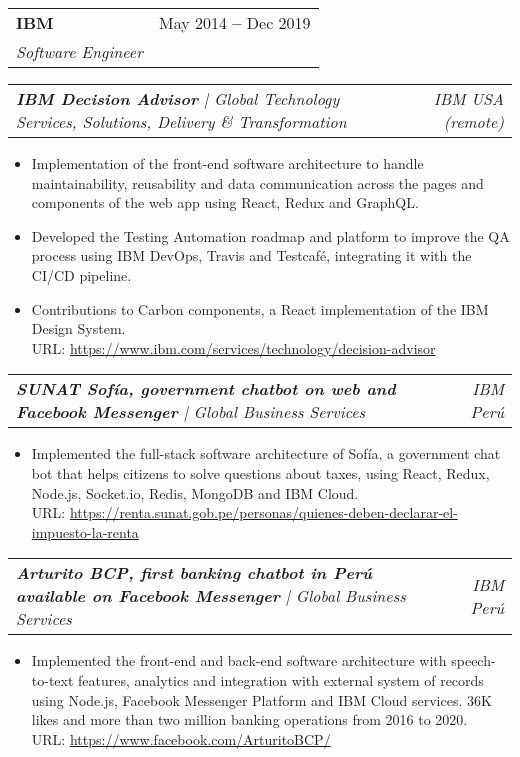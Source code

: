 \documentclass[letterpaper,11pt]{article}
\makeatletter
\newcommand{\resumeItem}[1]{
  \item\small{
    {#1 \vspace{-2pt}}
  }
}
\newcommand{\resumeSubheading}[4]{
  \vspace{-4pt}\item
    \begin{tabular*}{0.97\textwidth}[t]{l@{\extracolsep{\fill}}r}
      \textbf{#1} & \small#2 \\
      \textit{\small#3} & \textit{\small #4} \\
    \end{tabular*}\vspace{-7pt}
}
\newcommand{\resumeSubSubheading}[2]{
    \vspace{-2pt}\item
    \begin{tabular*}{0.97\textwidth}{l@{\extracolsep{\fill}}r}
      \textit{\small#1} & \textit{\small #2} \\
    \end{tabular*}\vspace{-7pt}
}
\newcommand{\resumeItemListStart}{\begin{itemize}}
\newcommand{\resumeItemListEnd}{\end{itemize}\vspace{-5pt}}
\makeatother
\begin{document}
    \vspace{13pt}

    \resumeSubheading
    {IBM}{May 2014 \textbf{--} Dec 2019}
    {Software Engineer}{}

      \resumeSubSubheading{\textbf{IBM Decision Advisor} | Global Technology Services, Solutions, Delivery \& Transformation }{IBM USA (remote)}
        \resumeItemListStart
          \resumeItem{Implementation of the front-end software architecture to handle maintainability, reusability and data communication across the pages and components of the web app using React, Redux and GraphQL.}
          \resumeItem{Developed the Testing Automation roadmap and platform to improve the QA process using IBM DevOps, Travis and Testcafé, integrating it with the CI/CD pipeline.}
          \resumeItem{Contributions to Carbon components, a React implementation of the IBM Design System.
          \\[1.5pt] URL: {\href{https://www.ibm.com/services/technology/decision-advisor}{\color{blue}https://www.ibm.com/services/technology/decision-advisor}}
          }
        \resumeItemListEnd

        \vspace{20pt}

      \resumeSubSubheading{\textbf{SUNAT Sofía, government chatbot on web and Facebook Messenger} | Global Business Services}{IBM Perú}
        \resumeItemListStart
          \resumeItem{Implemented the full-stack software architecture of Sofía, a government chat bot that helps citizens to solve questions about taxes, using React, Redux, Node.js, Socket.io, Redis, MongoDB and IBM Cloud.
          \\[1.5pt] URL: {\href{https://renta.sunat.gob.pe/personas/quienes-deben-declarar-el-impuesto-la-renta}{\color{blue}https://renta.sunat.gob.pe/personas/quienes-deben-declarar-el-impuesto-la-renta}}
          }
        \resumeItemListEnd

      \resumeSubSubheading{\textbf{Arturito BCP, first banking chatbot in Perú available on Facebook Messenger} |  Global Business Services}{IBM Perú}
        \resumeItemListStart
          \resumeItem{Implemented the front-end and back-end software architecture with speech-to-text features, analytics and integration with external system of records using Node.js, Facebook Messenger Platform and IBM Cloud services. 36K likes and more than two million banking operations from 2016 to 2020.
          \\[1.5pt] URL: {\href{https://www.facebook.com/ArturitoBCP/}{\color{blue}https://www.facebook.com/ArturitoBCP/}}
          }
        \resumeItemListEnd
\end{document}
